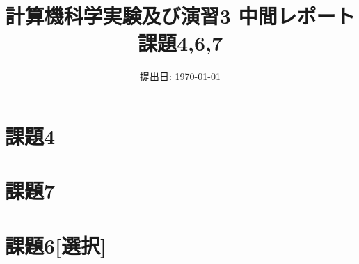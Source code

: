 \documentclass[a4paper]{jsarticle}
\begin{document}
\title{計算機科学実験及び演習3 中間レポート \\ \bf 課題4,6,7}
\author{}
\date{提出日: \today} %
\maketitle
\section{課題4}

\section{課題7}

\section{課題6[選択]}

\end{document}
